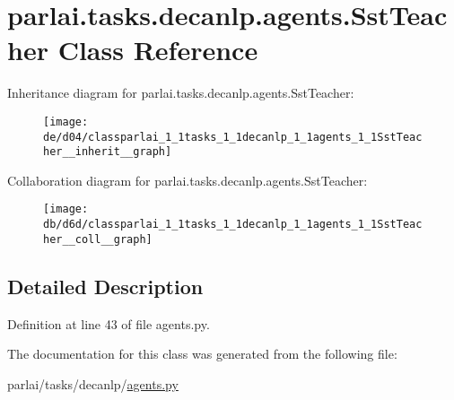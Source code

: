 \hypertarget{classparlai_1_1tasks_1_1decanlp_1_1agents_1_1SstTeacher}{}\section{parlai.\+tasks.\+decanlp.\+agents.\+Sst\+Teacher Class Reference}
\label{classparlai_1_1tasks_1_1decanlp_1_1agents_1_1SstTeacher}


Inheritance diagram for parlai.\+tasks.\+decanlp.\+agents.\+Sst\+Teacher\+:\nopagebreak
\begin{figure}[H]
\begin{center}
\leavevmode
\texttt{[image: de/d04/classparlai\_1\_1tasks\_1\_1decanlp\_1\_1agents\_1\_1SstTeacher\_\_inherit\_\_graph]}
\end{center}
\end{figure}


Collaboration diagram for parlai.\+tasks.\+decanlp.\+agents.\+Sst\+Teacher\+:\nopagebreak
\begin{figure}[H]
\begin{center}
\leavevmode
\texttt{[image: db/d6d/classparlai\_1\_1tasks\_1\_1decanlp\_1\_1agents\_1\_1SstTeacher\_\_coll\_\_graph]}
\end{center}
\end{figure}


\subsection{Detailed Description}


Definition at line 43 of file agents.\+py.



The documentation for this class was generated from the following file\+:\begin{DoxyCompactItemize}
\item 
parlai/tasks/decanlp/\hyperlink{parlai_2tasks_2decanlp_2agents_8py}{agents.\+py}\end{DoxyCompactItemize}

